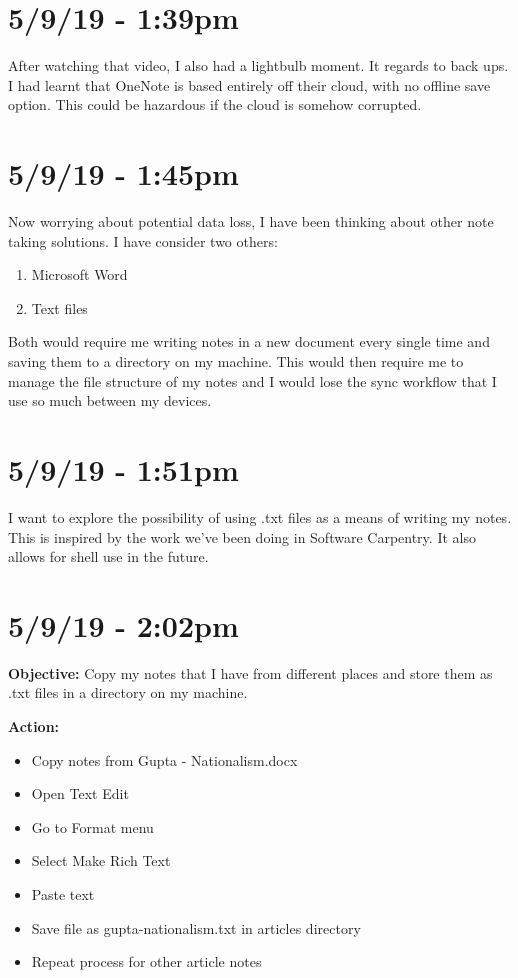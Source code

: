 \documentclass{article}
\begin{document}
\section*{5/9/19 - 1:39pm}

After watching that video, I also had a lightbulb moment. It regards to back ups. I had learnt that OneNote is based entirely off their cloud, with no offline save option. This could be hazardous if the cloud is somehow corrupted.

\section*{5/9/19 - 1:45pm}

Now worrying about potential data loss, I have been thinking about other note taking solutions. I have consider two others:
\begin{enumerate}
    \item Microsoft Word
    \item Text files
\end{enumerate}

Both would require me writing notes in a new document every single time and saving them to a directory on my machine. This would then require me to manage the file structure of my notes and I would lose the sync workflow that I use so much between my devices.

\section*{5/9/19 - 1:51pm}

I want to explore the possibility of using .txt files as a means of writing my notes. This is inspired by the work we've been doing in Software Carpentry. It also allows for shell use in the future.

\section*{5/9/19 - 2:02pm}

\textbf{Objective:} Copy my notes that I have from different places and store them as .txt files in a directory on my machine.

\textbf{Action:}
\begin{itemize}
    \item Copy notes from Gupta - Nationalism.docx
    \item Open Text Edit
    \item Go to Format menu
    \item Select Make Rich Text
    \item Paste text
    \item Save file as gupta-nationalism.txt in articles directory
    \item Repeat process for other article notes
\end{itemize}
\end{document}
